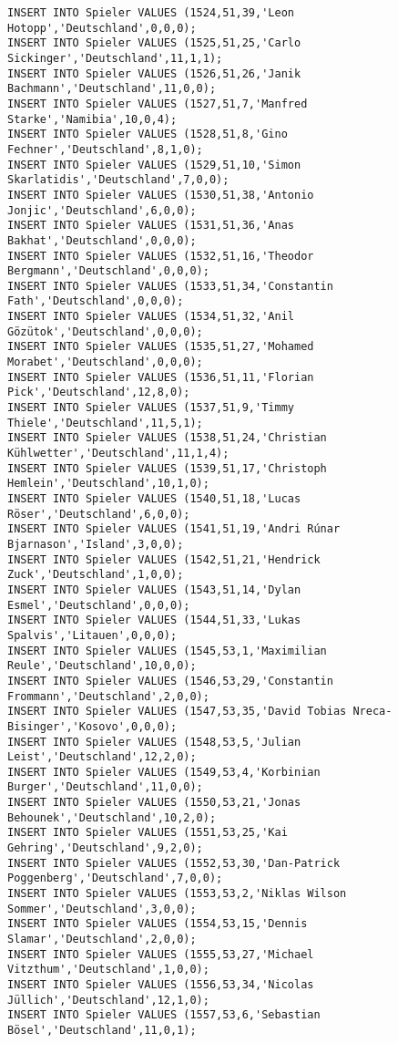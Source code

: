 \documentclass{bschlangaul-aufgabe}
\begin{document}
\begin{verbatim}
INSERT INTO Spieler VALUES (1524,51,39,'Leon Hotopp','Deutschland',0,0,0);
INSERT INTO Spieler VALUES (1525,51,25,'Carlo Sickinger','Deutschland',11,1,1);
INSERT INTO Spieler VALUES (1526,51,26,'Janik Bachmann','Deutschland',11,0,0);
INSERT INTO Spieler VALUES (1527,51,7,'Manfred Starke','Namibia',10,0,4);
INSERT INTO Spieler VALUES (1528,51,8,'Gino Fechner','Deutschland',8,1,0);
INSERT INTO Spieler VALUES (1529,51,10,'Simon Skarlatidis','Deutschland',7,0,0);
INSERT INTO Spieler VALUES (1530,51,38,'Antonio Jonjic','Deutschland',6,0,0);
INSERT INTO Spieler VALUES (1531,51,36,'Anas Bakhat','Deutschland',0,0,0);
INSERT INTO Spieler VALUES (1532,51,16,'Theodor Bergmann','Deutschland',0,0,0);
INSERT INTO Spieler VALUES (1533,51,34,'Constantin Fath','Deutschland',0,0,0);
INSERT INTO Spieler VALUES (1534,51,32,'Anil Gözütok','Deutschland',0,0,0);
INSERT INTO Spieler VALUES (1535,51,27,'Mohamed Morabet','Deutschland',0,0,0);
INSERT INTO Spieler VALUES (1536,51,11,'Florian Pick','Deutschland',12,8,0);
INSERT INTO Spieler VALUES (1537,51,9,'Timmy Thiele','Deutschland',11,5,1);
INSERT INTO Spieler VALUES (1538,51,24,'Christian Kühlwetter','Deutschland',11,1,4);
INSERT INTO Spieler VALUES (1539,51,17,'Christoph Hemlein','Deutschland',10,1,0);
INSERT INTO Spieler VALUES (1540,51,18,'Lucas Röser','Deutschland',6,0,0);
INSERT INTO Spieler VALUES (1541,51,19,'Andri Rúnar Bjarnason','Island',3,0,0);
INSERT INTO Spieler VALUES (1542,51,21,'Hendrick Zuck','Deutschland',1,0,0);
INSERT INTO Spieler VALUES (1543,51,14,'Dylan Esmel','Deutschland',0,0,0);
INSERT INTO Spieler VALUES (1544,51,33,'Lukas Spalvis','Litauen',0,0,0);
INSERT INTO Spieler VALUES (1545,53,1,'Maximilian Reule','Deutschland',10,0,0);
INSERT INTO Spieler VALUES (1546,53,29,'Constantin Frommann','Deutschland',2,0,0);
INSERT INTO Spieler VALUES (1547,53,35,'David Tobias Nreca-Bisinger','Kosovo',0,0,0);
INSERT INTO Spieler VALUES (1548,53,5,'Julian Leist','Deutschland',12,2,0);
INSERT INTO Spieler VALUES (1549,53,4,'Korbinian Burger','Deutschland',11,0,0);
INSERT INTO Spieler VALUES (1550,53,21,'Jonas Behounek','Deutschland',10,2,0);
INSERT INTO Spieler VALUES (1551,53,25,'Kai Gehring','Deutschland',9,2,0);
INSERT INTO Spieler VALUES (1552,53,30,'Dan-Patrick Poggenberg','Deutschland',7,0,0);
INSERT INTO Spieler VALUES (1553,53,2,'Niklas Wilson Sommer','Deutschland',3,0,0);
INSERT INTO Spieler VALUES (1554,53,15,'Dennis Slamar','Deutschland',2,0,0);
INSERT INTO Spieler VALUES (1555,53,27,'Michael Vitzthum','Deutschland',1,0,0);
INSERT INTO Spieler VALUES (1556,53,34,'Nicolas Jüllich','Deutschland',12,1,0);
INSERT INTO Spieler VALUES (1557,53,6,'Sebastian Bösel','Deutschland',11,0,1);

\end{verbatim}
\end{document}

